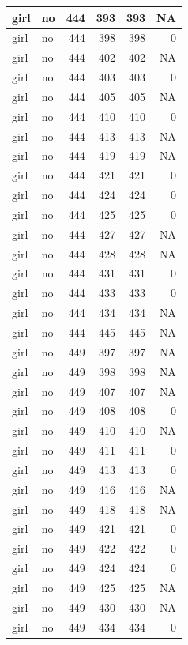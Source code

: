 \documentclass[man]{apa6}
\begin{document}
\begin{tabular}{l|l|r|r|r|r}
\hline
girl & no & 444 & 393 & 393 & NA\\
\hline
girl & no & 444 & 398 & 398 & 0\\
\hline
girl & no & 444 & 402 & 402 & NA\\
\hline
girl & no & 444 & 403 & 403 & 0\\
\hline
girl & no & 444 & 405 & 405 & NA\\
\hline
girl & no & 444 & 410 & 410 & 0\\
\hline
girl & no & 444 & 413 & 413 & NA\\
\hline
girl & no & 444 & 419 & 419 & NA\\
\hline
girl & no & 444 & 421 & 421 & 0\\
\hline
girl & no & 444 & 424 & 424 & 0\\
\hline
girl & no & 444 & 425 & 425 & 0\\
\hline
girl & no & 444 & 427 & 427 & NA\\
\hline
girl & no & 444 & 428 & 428 & NA\\
\hline
girl & no & 444 & 431 & 431 & 0\\
\hline
girl & no & 444 & 433 & 433 & 0\\
\hline
girl & no & 444 & 434 & 434 & NA\\
\hline
girl & no & 444 & 445 & 445 & NA\\
\hline
girl & no & 449 & 397 & 397 & NA\\
\hline
girl & no & 449 & 398 & 398 & NA\\
\hline
girl & no & 449 & 407 & 407 & NA\\
\hline
girl & no & 449 & 408 & 408 & 0\\
\hline
girl & no & 449 & 410 & 410 & NA\\
\hline
girl & no & 449 & 411 & 411 & 0\\
\hline
girl & no & 449 & 413 & 413 & 0\\
\hline
girl & no & 449 & 416 & 416 & NA\\
\hline
girl & no & 449 & 418 & 418 & NA\\
\hline
girl & no & 449 & 421 & 421 & 0\\
\hline
girl & no & 449 & 422 & 422 & 0\\
\hline
girl & no & 449 & 424 & 424 & 0\\
\hline
girl & no & 449 & 425 & 425 & NA\\
\hline
girl & no & 449 & 430 & 430 & NA\\
\hline
girl & no & 449 & 434 & 434 & 0\\

\end{tabular}
\end{document}
